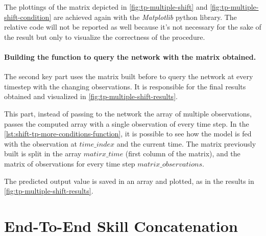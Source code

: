 The plottings of the matrix depicted in \cref{fig:tp-multiple-shift} and \cref{fig:tp-multiple-shift-condition} are achieved again with the \emph{Matplotlib} python library. The relative code will not be reported as well because it's not necessary for the sake of the result but only to visualize the correctness of the procedure.


\paragraph{Building the function to query the network with the matrix obtained. }
The second key part uses the matrix built before to query the network at every timestep with the changing observations. It is responsible for the final results obtained and visualized in \cref{fig:tp-multiple-shift-results}.

This part, instead of passing to the network the array of multiple observations, passes the computed array with a single observation of every time step. In the \cref{lst:shift-tp-more-conditions-function}, it is possible to see how the model is fed with the observation at $time\_index$ and the current time. The matrix previously built is split in the array $matirx\_time$  (first column of the matrix), and the matrix of observations for every time step $matrix\_observations$.



The predicted output value is saved in an array and plotted, as in the results in \cref{fig:tp-multiple-shift-results}.

\newpage
\section{End-To-End Skill Concatenation}

